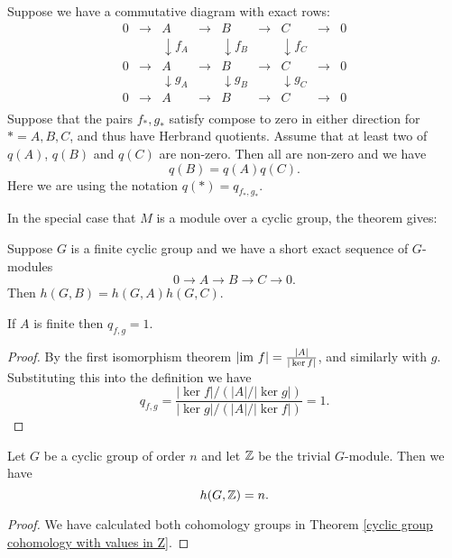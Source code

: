 \begin{theorem}
  \label{Herbrand of short exact sequence}
  Suppose we have a commutative diagram with exact rows:
  \[
    \begin{matrix}
      0 &\to& A &\to& B &\to& C &\to& 0 \\
      &&\downarrow f_A &&\downarrow f_B &&\downarrow f_C \\
      0 &\to& A &\to& B &\to& C &\to& 0 \\
      &&\downarrow g_A &&\downarrow g_B &&\downarrow g_C \\
      0 &\to& A &\to& B &\to& C &\to& 0 \\
    \end{matrix}
  \]
  Suppose that the pairs $f_*,g_*$ satisfy compose to zero in either direction
  for $*=A,B,C$, and thus have Herbrand quotients.
  Assume that at least two of $q(A)$, $q(B)$ and $q(C)$ are non-zero.
  Then all are non-zero and we have
  \[
    q(B) = q(A) q(C).
  \]
  Here we are using the notation $q(*) = q_{f_*,g_*}$.
\end{theorem}


In the special case that $M$ is a module over a cyclic group, the theorem gives:

\begin{corollary}
  Suppose $G$ is a finite cyclic group and we have a short exact sequence of $G$-modules
  \[
    0 \to A \to B \to C \to 0.
  \]
  Then $h(G,B) = h(G,A) h(G,C)$.
\end{corollary}

\begin{theorem}
  \label{Herbrand of finite}
  If $A$ is finite then $q_{f,g} = 1$.
\end{theorem}

\begin{proof}
  By the first isomorphism theorem $|\mathrm{im}\  f| = \frac{|A|}{|\ker f|}$, and similarly with $g$.
  Substituting this into the definition we have
  \[
    q_{f,g} = \frac{|\ker f| / (|A| / |\ker g|)}{|\ker g| / (|A| / |\ker f|)}
    = 1.
  \]
\end{proof}

\begin{lemma}
  Let $G$ be a cyclic group of order $n$ and let ${\mathbb Z}$ be the trivial $G$-module.
  Then we have
  \[
    h(G,{\mathbb Z}) = n.
  \]
\end{lemma}

\begin{proof}
  We have calculated both cohomology groups in
  Theorem \ref{cyclic group cohomology with values in Z}.
\end{proof}



